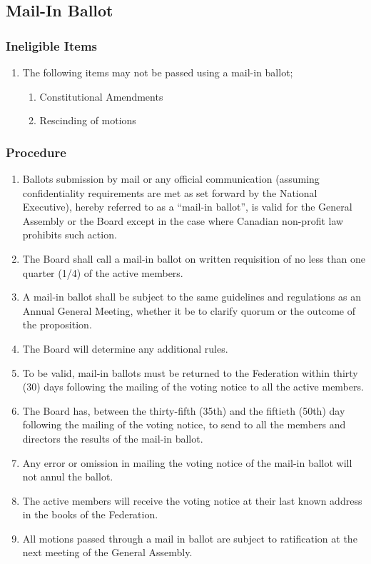 \subsection{Mail-In Ballot}
\label{mail-in-ballot}

\subsubsection{Ineligible Items}
\label{ineligible-items}

\begin{enumerate}
 \item
  The following items may not be passed using a mail-in ballot;
  \begin{enumerate}
   \item
    Constitutional Amendments
   \item
    Rescinding of motions
  \end{enumerate}
\end{enumerate}

\subsubsection{Procedure}
\label{procedure}

\begin{enumerate}
 \item
  Ballots submission by mail or any official communication (assuming confidentiality requirements are met as set forward by the National Executive), hereby referred to as a “mail-in ballot”, is valid for the General Assembly or the Board except in the case where Canadian non-profit law prohibits such action.
 \item
  The Board shall call a mail-in ballot on written requisition of no less than one quarter (1/4) of the active members.
 \item
  A mail-in ballot shall be subject to the same guidelines and regulations as an Annual General Meeting, whether it be to clarify quorum or the outcome of the proposition.
 \item
  The Board will determine any additional rules.
 \item
  To be valid, mail-in ballots must be returned to the Federation within thirty (30) days following the mailing of the voting notice to all the active members.
 \item
  The Board has, between the thirty-fifth (35th) and the fiftieth (50th) day following the mailing of the voting notice, to send to all the members and directors the results of the mail-in ballot.
 \item
  Any error or omission in mailing the voting notice of the mail-in ballot will not annul the ballot.
 \item
  The active members will receive the voting notice at their last known address in the books of the Federation.
 \item
  All motions passed through a mail in ballot are subject to ratification at the next meeting of the General Assembly.
\end{enumerate}

